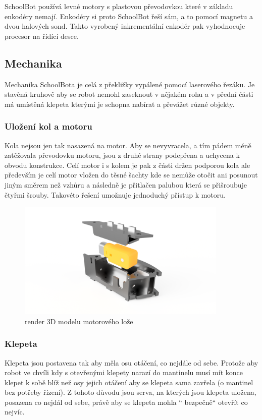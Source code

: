 \documentclass{template/socthesis}
\begin{document}
SchoolBot používá levné motory s plastovou převodovkou které v základu enkodéry nemají. Enkodéry si proto SchoolBot řeší sám, a to pomocí magnetu a dvou halových sond. Takto vyrobený inkrementální enkodér pak vyhodnocuje procesor na řídící desce.

\newpage

\subsection{Mechanika}

Mechanika SchoolBota je celá z překližky vypálené pomocí laserového řezáku. Je stavěná kruhově aby se robot nemohl zaseknout v nějakém rohu a v přední části má umístěná klepeta kterými je schopna nabírat a převážet různé objekty. 

\subsubsection{Uložení kol a motoru}

Kola nejsou jen tak nasazená na motor. Aby se nevyvracela, a tím pádem méně zatěžovala převodovku motoru, jsou z druhé strany podepřena a uchycena k obvodu konstrukce.
Celí motor i s kolem je pak z části držen podporou kola ale především je celí motor vložen do těsné šachty kde se nemůže otočit ani posunout jiným směrem než vzhůru a následně je přitlačen palubou která se přišroubuje čtyřmi šrouby. Takovéto řešení umožnuje jednoduchý přístup k motoru.

\begin{figure}[h]
	\centering
	\includegraphics[width=0.893\textwidth]{img/ulozeni_motoru.png}
	\caption{render 3D modelu motorového lože}
\end{figure}

\newpage

\subsubsection{Klepeta}
Klepeta jsou postavena tak aby měla osu otáčení, co nejdále od sebe. Protože aby robot ve chvíli kdy s otevřenými klepety narazí do mantinelu musí mít konce klepet k sobě blíž než osy jejich otáčení aby se klepeta sama zavřela (o mantinel bez potřeby řízení). Z tohoto důvodu jsou serva, na kterých jsou klepeta uložena, posazena co nejdál od sebe, právě aby se klepeta mohla “ bezpečně“ otevřít co nejvíc.
\end{document}
